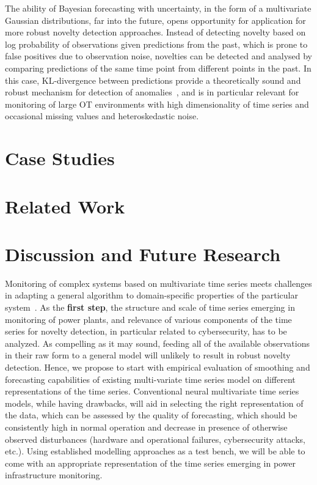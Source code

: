 \documentclass[runningheads]{llncs}
\begin{document}
The ability of Bayesian forecasting with uncertainty, in the form of a multivariate Gaussian distributions, far into the future, opens opportunity for application for more robust novelty detection
approaches. Instead of detecting novelty based on log probability of observations given predictions from the past, which is prone to false positives due to observation noise, novelties can be detected and analysed by comparing predictions of the same time point from different points in the past. In this case, KL-divergence between predictions provide a theoretically sound and robust mechanism for detection of anomalies~\cite{10.1145/3297280.3297414}, and is in particular relevant for monitoring of large OT environments with high dimensionality of time series and occasional missing values and heteroskedastic noise.

\section{Case Studies}


\section{Related Work} 

\section{Discussion and Future Research}

Monitoring of complex systems based on multivariate time series meets
challenges in adapting a general algorithm to  domain-specific properties of
the particular system~\cite{DBLP:conf/iccst/DymshitsMT17}. As the \textbf{first
step}, the structure and scale of time series emerging in monitoring of power
plants, and relevance of various components of the time series for novelty
detection, in particular related to cybersecurity, has to be analyzed. As
compelling as it may sound, feeding all of the available observations in their
raw form to a general model will unlikely to result in robust novelty
detection. Hence, we propose to start with empirical evaluation of smoothing
and forecasting capabilities of existing multi-variate time series model on
different representations of the time series. Conventional neural multivariate
time series models, while having drawbacks, will aid in selecting the right
representation of the data, which can be assessed by the quality of
forecasting, which should be consistently high in normal operation and decrease
in presence of otherwise observed disturbances (hardware and operational
failures, cybersecurity attacks, etc.). Using established modelling approaches
as a test bench, we will be able to come with an appropriate representation of
the time series emerging in power infrastructure monitoring.
\end{document}
